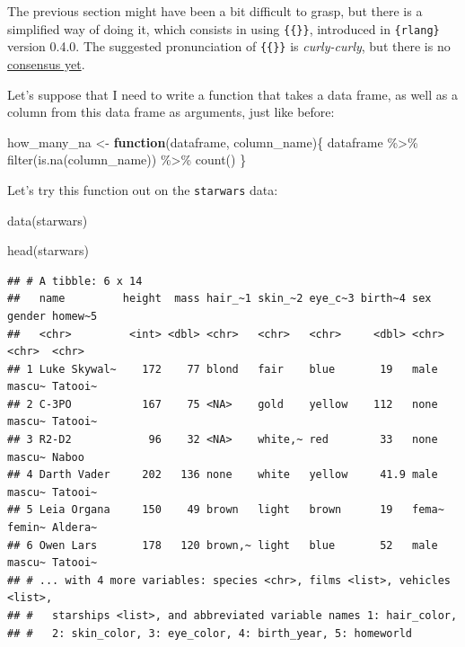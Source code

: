 \documentclass[
]{article}
\newenvironment{Shaded}{\begin{snugshade}}{\end{snugshade}}
\newcommand{\ControlFlowTok}[1]{\textcolor[rgb]{0.13,0.29,0.53}{\textbf{#1}}}
\newcommand{\FunctionTok}[1]{\textcolor[rgb]{0.00,0.00,0.00}{#1}}
\newcommand{\NormalTok}[1]{#1}
\newcommand{\OtherTok}[1]{\textcolor[rgb]{0.56,0.35,0.01}{#1}}
\newcommand{\SpecialCharTok}[1]{\textcolor[rgb]{0.00,0.00,0.00}{#1}}
\begin{document}
The previous section might have been a bit difficult to grasp, but there is a simplified way of doing it,
which consists in using \texttt{\{\{\}\}}, introduced in \texttt{\{rlang\}} version 0.4.0.
The suggested pronunciation of \texttt{\{\{\}\}} is \emph{curly-curly}, but there is no
\href{https://twitter.com/JonTheGeek/status/1144815369766547456}{consensus yet}.

Let's suppose that I need to write a function that takes a data frame, as well as a column from
this data frame as arguments, just like before:

\begin{Shaded}
\begin{Highlighting}[]
\NormalTok{how\_many\_na }\OtherTok{\textless{}{-}} \ControlFlowTok{function}\NormalTok{(dataframe, column\_name)\{}
\NormalTok{  dataframe }\SpecialCharTok{\%\textgreater{}\%}
    \FunctionTok{filter}\NormalTok{(}\FunctionTok{is.na}\NormalTok{(column\_name)) }\SpecialCharTok{\%\textgreater{}\%}
    \FunctionTok{count}\NormalTok{()}
\NormalTok{\}}
\end{Highlighting}
\end{Shaded}

Let's try this function out on the \texttt{starwars} data:

\begin{Shaded}
\begin{Highlighting}[]
\FunctionTok{data}\NormalTok{(starwars)}

\FunctionTok{head}\NormalTok{(starwars)}
\end{Highlighting}
\end{Shaded}

\begin{verbatim}
## # A tibble: 6 x 14
##   name         height  mass hair_~1 skin_~2 eye_c~3 birth~4 sex   gender homew~5
##   <chr>         <int> <dbl> <chr>   <chr>   <chr>     <dbl> <chr> <chr>  <chr>  
## 1 Luke Skywal~    172    77 blond   fair    blue       19   male  mascu~ Tatooi~
## 2 C-3PO           167    75 <NA>    gold    yellow    112   none  mascu~ Tatooi~
## 3 R2-D2            96    32 <NA>    white,~ red        33   none  mascu~ Naboo  
## 4 Darth Vader     202   136 none    white   yellow     41.9 male  mascu~ Tatooi~
## 5 Leia Organa     150    49 brown   light   brown      19   fema~ femin~ Aldera~
## 6 Owen Lars       178   120 brown,~ light   blue       52   male  mascu~ Tatooi~
## # ... with 4 more variables: species <chr>, films <list>, vehicles <list>,
## #   starships <list>, and abbreviated variable names 1: hair_color,
## #   2: skin_color, 3: eye_color, 4: birth_year, 5: homeworld
\end{verbatim}
\end{document}
